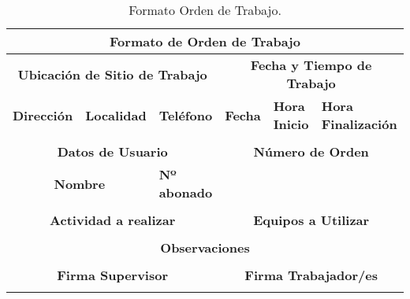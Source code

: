 \begin{table}[H]
  \centering
  \small
    \begin{tabular}{|c|c|c|c|c|c|}
    \hline
    \multicolumn{6}{|c|}{\cellcolor[HTML]{C5D9F1}\textbf{Formato de Orden de Trabajo}} \bigstrut\\
    \hline
    \multicolumn{3}{|c|}{\textbf{Ubicación de Sitio de Trabajo}} & \multicolumn{3}{c|}{\textbf{Fecha y Tiempo de Trabajo}} \bigstrut\\
    \hline
    \multicolumn{1}{|l|}{\textbf{Dirección}} & \multicolumn{1}{l|}{\textbf{Localidad}} & \multicolumn{1}{l|}{\textbf{Teléfono}} & \multicolumn{1}{l|}{\textbf{Fecha}} & \multicolumn{1}{l|}{\textbf{Hora Inicio}} & \multicolumn{1}{l|}{\textbf{Hora Finalización}} \bigstrut\\
    \hline
    \multirow{2}[2]{*}{} & \multirow{2}[2]{*}{} & \multirow{2}[2]{*}{} & \multirow{2}[2]{*}{} & \multirow{2}[2]{*}{} & \multirow{2}[2]{*}{} \bigstrut[t]\\
          &       &       &       &       &  \bigstrut[b]\\
    \hline
    \multicolumn{3}{|c|}{\textbf{Datos de Usuario}} & \multicolumn{3}{c|}{\textbf{Número de Orden}} \bigstrut\\
    \hline
    \multicolumn{2}{|c|}{\textbf{Nombre}} & \multicolumn{1}{l|}{\textbf{Nº abonado}} & \multicolumn{3}{c|}{\multirow{2}[4]{*}{}} \bigstrut\\
\cline{1-3}    \multicolumn{2}{|c|}{} &       & \multicolumn{3}{c|}{} \bigstrut\\
    \hline
    \multicolumn{3}{|c|}{\textbf{Actividad a realizar}} & \multicolumn{3}{c|}{\textbf{Equipos a Utilizar}} \bigstrut\\
    \hline
    \multicolumn{3}{|c|}{\multirow{2}[2]{*}{}} & \multicolumn{3}{c|}{\multirow{2}[2]{*}{}} \bigstrut[t]\\
    \multicolumn{3}{|c|}{} & \multicolumn{3}{c|}{} \bigstrut[b]\\
    \hline
    \multicolumn{6}{|c|}{\textbf{Observaciones}} \bigstrut\\
    \hline
    \multicolumn{6}{|c|}{\multirow{2}[2]{*}{}} \bigstrut[t]\\
    \multicolumn{6}{|c|}{} \bigstrut[b]\\
    \hline
    \multicolumn{3}{|c|}{\textbf{Firma Supervisor}} & \multicolumn{3}{c|}{\textbf{Firma Trabajador/es}} \bigstrut\\
    \hline
    \multicolumn{3}{|c|}{\multirow{2}[2]{*}{}} & \multicolumn{3}{c|}{\multirow{2}[2]{*}{}} \bigstrut[t]\\
    \multicolumn{3}{|c|}{} & \multicolumn{3}{c|}{} \bigstrut[b]\\
    \hline
    \end{tabular}%
    \caption{Formato Orden de Trabajo.}
  \label{tab:ordentrabajo}%
\end{table}%







